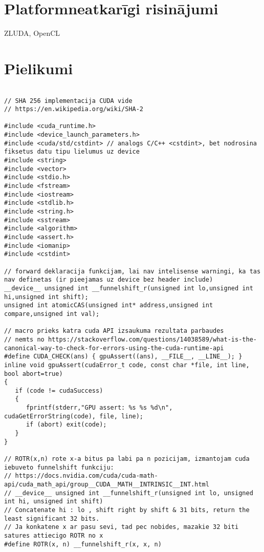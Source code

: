 \documentclass[12pt]{report}%
\theoremstyle{definition}
\begin{document}
\chapter{Platformneatkarīgi risinājumi}
ZLUDA, OpenCL


\cleardoublepage
{}
{}
\printbibliography

\newpage
\chapter*{Pielikumi}

\begin{lstlisting}[caption={Paroļu lauzēja implementācija CUDA vidē},
  label=lst:cuda_impl,
  captionpos=t
  ]

// SHA 256 implementacija CUDA vide
// https://en.wikipedia.org/wiki/SHA-2

#include <cuda_runtime.h>
#include <device_launch_parameters.h>
#include <cuda/std/cstdint> // analogs C/C++ <cstdint>, bet nodrosina fiksetus datu tipu lielumus uz device
#include <string>
#include <vector>
#include <stdio.h>
#include <fstream>
#include <iostream>
#include <stdlib.h>
#include <string.h>
#include <sstream>
#include <algorithm>
#include <assert.h>
#include <iomanip>
#include <cstdint>

// forward deklaracija funkcijam, lai nav intelisense warningi, ka tas nav definetas (ir pieejamas uz device bez header include)
__device__ unsigned int __funnelshift_r(unsigned int lo,unsigned int hi,unsigned int shift);
unsigned int atomicCAS(unsigned int* address,unsigned int compare,unsigned int val);

// macro prieks katra cuda API izsaukuma rezultata parbaudes
// nemts no https://stackoverflow.com/questions/14038589/what-is-the-canonical-way-to-check-for-errors-using-the-cuda-runtime-api
#define CUDA_CHECK(ans) { gpuAssert((ans), __FILE__, __LINE__); }
inline void gpuAssert(cudaError_t code, const char *file, int line, bool abort=true)
{
   if (code != cudaSuccess) 
   {
      fprintf(stderr,"GPU assert: %s %s %d\n", cudaGetErrorString(code), file, line);
      if (abort) exit(code);
   }
}

// ROTR(x,n) rote x-a bitus pa labi pa n pozicijam, izmantojam cuda iebuveto funnelshift funkciju:
// https://docs.nvidia.com/cuda/cuda-math-api/cuda_math_api/group__CUDA__MATH__INTRINSIC__INT.html 
// __device__ unsigned int __funnelshift_r(unsigned int lo, unsigned int hi, unsigned int shift)
// Concatenate hi : lo , shift right by shift & 31 bits, return the least significant 32 bits. 
// Ja konkatene x ar pasu sevi, tad pec nobides, mazakie 32 biti satures attiecigo ROTR no x
#define ROTR(x, n) __funnelshift_r(x, x, n)


\end{lstlisting}
\end{document}
